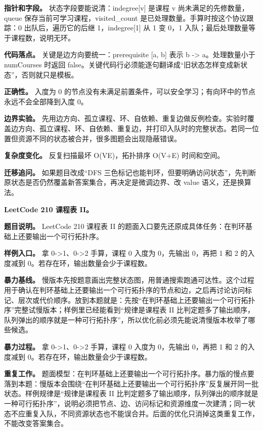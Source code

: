 \textbf{指针和字段。} 状态字段要能说清：indegree[v] 是课程 v 尚未满足的先修数量，queue 保存当前可学习课程，visited\_count 是已处理数量。手算时按这个协议跟踪：0 出队后，遍历它的后继 1，indegree[1] 从 1 变 0，1 入队；最后处理数量等于课程数，说明无环。

\textbf{代码落点。} 关键是边方向要统一：prerequisite [a, b] 表示 b -> a。处理数量小于 numCourses 时返回 false。关键代码行必须能逐句翻译成“旧状态怎样变成新状态”，否则就只是模板。

\textbf{正确性。} 入度为 0 的节点没有未满足前置条件，可以安全学习；有向环中的节点永远不会全部降到入度 0。

\textbf{边界实验。} 先用边方向、孤立课程、环、自依赖、重复边做反例检查。实验时覆盖边方向、孤立课程、环、自依赖、重复边，并打印入队时的完整状态。若同一位置但资源不同的状态被合并，很多图题会出现隐蔽错误。

\textbf{复杂度变化。} 反复扫描最坏 O(VE)，拓扑排序 O(V+E) 时间和空间。

\textbf{迁移追问。} 如果题目改成“DFS 三色标记也能判环，但要明确访问状态”，先判断原状态是否仍然覆盖新答案集合，再决定是微调边界、改 value 语义，还是换算法。

\noindent\textbf{LeetCode 210 课程表 II。}

\textbf{题目说明。} LeetCode 210 课程表 II 的题面入口要先还原成具体任务：在判环基础上还要输出一个可行拓扑序。

\textbf{样例入口。} 拿 0->1、0->2 手算，课程 0 入度为 0，先输出 0，再把 1 和 2 的入度减到 0。若存在环，输出数量会少于课程数。

\textbf{暴力基线。} 慢版本先按题意画出完整状态图，用普通搜索跑通可达性。这个过程用于确认在判环基础上还要输出一个可行拓扑序的节点和边，之后再讨论访问标记、层次或代价顺序。放到本题就是：先按“在判环基础上还要输出一个可行拓扑序”完整试慢版本；样例里已经能看到“规律是课程表 II 比判定题多了输出顺序，队列弹出的顺序就是一种可行拓扑序”，所以优化前必须先能说清慢版本枚举了哪些候选。

\textbf{暴力过程。} 拿 0->1、0->2 手算，课程 0 入度为 0，先输出 0，再把 1 和 2 的入度减到 0。若存在环，输出数量会少于课程数。

\textbf{重复工作。} 题面模型：在判环基础上还要输出一个可行拓扑序。暴力版的慢点要落到本题：慢版本会围绕“在判环基础上还要输出一个可行拓扑序”反复展开同一批状态。样例规律是“规律是课程表 II 比判定题多了输出顺序，队列弹出的顺序就是一种可行拓扑序”，说明必须把节点、边、访问标记和资源维度一次建清；同一状态不应重复入队，不同资源状态也不能误合并。后面的优化只消掉这类重复工作，不能改变答案集合。

